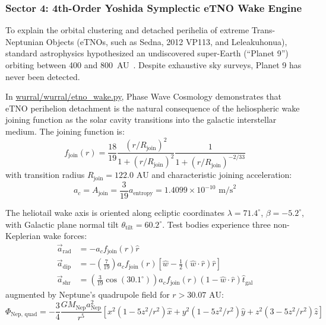 \documentclass[11pt,a4paper]{article}
\begin{document}
\subsubsection{Sector 4: 4th-Order Yoshida Symplectic eTNO Wake Engine}
\label{subsubsec:etno_wake_engine}

To explain the orbital clustering and detached perihelia of extreme Trans-Neptunian Objects (eTNOs, such as Sedna, 2012 VP113, and Leleakuhonua), standard astrophysics hypothesized an undiscovered super-Earth (``Planet 9'') orbiting between 400 and 800~AU~\cite{Batygin2016}. Despite exhaustive sky surveys, Planet 9 has never been detected.

In \url{wurral/wurral/etno_wake.py}, Phase Wave Cosmology demonstrates that eTNO perihelion detachment is the natural consequence of the heliospheric wake joining function as the solar cavity transitions into the galactic interstellar medium. The joining function is:
\begin{equation}
f_{\text{join}}(r) = \frac{18}{19} \frac{(r/R_{\text{join}})^2}{1 + (r/R_{\text{join}})^2} \frac{1}{1 + (r/R_{\text{join}})^{-2/33}}
\label{eq:f_join}
\end{equation}
with transition radius $R_{\text{join}} = 122.0\text{ AU}$ and characteristic joining acceleration:
\begin{equation}
a_c = A_{\text{join}} = \frac{3}{19} a_{\text{entropy}} = 1.4099 \times 10^{-10}\text{ m/s}^2
\label{eq:a_join}
\end{equation}

The heliotail wake axis is oriented along ecliptic coordinates $\lambda = 71.4^\circ$, $\beta = -5.2^\circ$, with Galactic plane normal tilt $\theta_{\text{tilt}} = 60.2^\circ$. Test bodies experience three non-Keplerian wake forces:
\begin{align}
\vec{a}_{\text{rad}} &= - a_c f_{\text{join}}(r) \hat{r} \label{eq:wake_rad} \\
\vec{a}_{\text{dip}} &= - \left(\frac{7}{19}\right) a_c f_{\text{join}}(r) \left[ \hat{w} - \frac{1}{2}(\hat{w} \cdot \hat{r})\hat{r} \right] \label{eq:wake_dip} \\
\vec{a}_{\text{shr}} &= \left( \frac{3}{19}\cos(30.1^\circ) \right) a_c f_{\text{join}}(r) (1 - \hat{w} \cdot \hat{r}) \hat{t}_{\text{gal}} \label{eq:wake_shr}
\end{align}
augmented by Neptune's quadrupole field for $r > 30.07\text{ AU}$:
\begin{equation}
\Phi_{\text{Nep, quad}} = -\frac{3}{4} \frac{GM_{\text{Nep}} a_{\text{Nep}}^2}{r^5} \left[ x^2(1 - 5z^2/r^2)\hat{x} + y^2(1 - 5z^2/r^2)\hat{y} + z^2(3 - 5z^2/r^2)\hat{z} \right]
\label{eq:nep_quad}
\end{equation}
\end{document}
